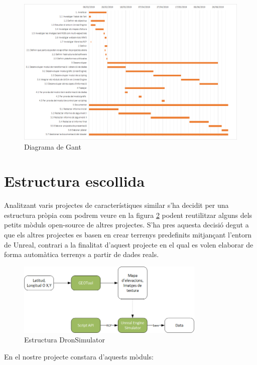 \documentclass[10pt,a4paper]{article}
\begin{document}
\begin{figure}[!h]
\centering
  	\includegraphics[width=1\textwidth]{gant}
	\caption{Diagrama de Gant}
	\label{fig-gant}
\end{figure}

\newpage
\section{Estructura escollida}

Analitzant varis projectes de característiques similar s'ha decidit per una estructura pròpia com podrem veure en la figura \ref{fig-dronsimulatormodules} podent reutilitzar alguns dels petits mòduls open-source de altres projectes. S'ha pres aquesta decisió degut a que els altres projectes es basen en crear terrenys predefinits mitjançant l'entorn de Unreal, contrari a la finalitat d'aquest projecte en el qual es volen elaborar de forma automàtica terrenys a partir de dades reals.

\begin{figure}[!h]
\centering
  	\includegraphics[width=0.8\textwidth]{structuretfg}
	\caption{Estructura DronSimulator}
	\label{fig-dronsimulatormodules}
\end{figure}

En el nostre projecte constara d'aquests mòduls:
\end{document}
